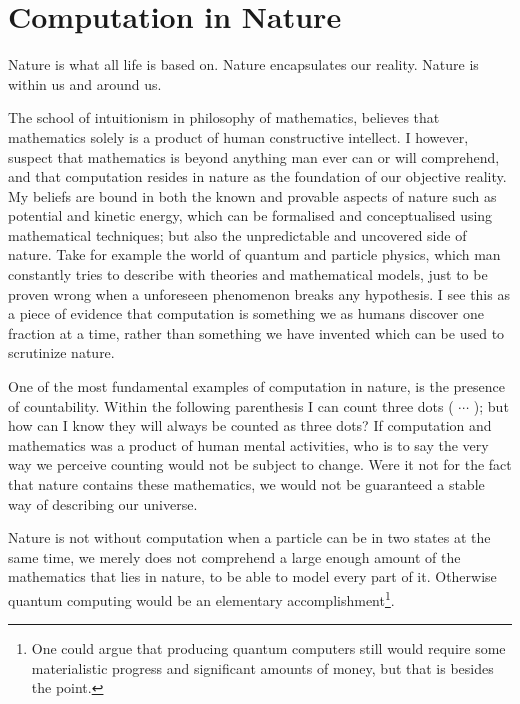 \chapter{Computation in Nature}

\begin{displayquote}
    \begin{center}
Nature is what all life is based on.
Nature encapsulates our reality.
Nature is within us and around us.
    \end{center}
\end{displayquote}

\noindent
The school of intuitionism in philosophy of mathematics, believes that mathematics solely is a product of human constructive intellect.
I however, suspect that mathematics is beyond anything man ever can or will comprehend, and that computation resides in nature as the foundation of our objective reality.
My beliefs are bound in both the known and provable aspects of nature such as potential and kinetic energy, which can be formalised and conceptualised using mathematical techniques; but also the unpredictable and uncovered side of nature.
Take for example the world of quantum and particle physics, which man constantly tries to describe with theories and mathematical models, just to be proven wrong when a unforeseen phenomenon breaks any hypothesis.
I see this as a piece of evidence that computation is something we as humans discover one fraction at a time, rather than something we have invented which can be used to scrutinize nature.

One of the most fundamental examples of computation in nature, is the presence of countability.
Within the following parenthesis I can count three dots ( $\cdots$ ); but how can I know they will always be counted as three dots?
If computation and mathematics was a product of human mental activities, who is to say the very way we perceive counting would not be subject to change.
Were it not for the fact that nature contains these mathematics, we would not be guaranteed a stable way of describing our universe.

Nature is not without computation when a particle can be in two states at the same time, we merely does not comprehend a large enough amount of the mathematics that lies in nature, to be able to model every part of it.
Otherwise quantum computing would be an elementary accomplishment\footnote{One could argue that producing quantum computers still would require some materialistic progress and significant amounts of money, but that is besides the point.}.

